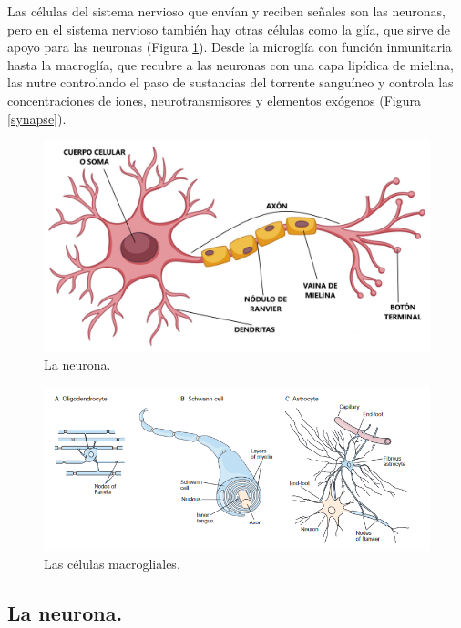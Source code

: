 Las células del sistema nervioso que envían y reciben señales son las neuronas, pero en el sistema nervioso también hay otras células como la glía, que sirve de apoyo para las neuronas (Figura \ref{neuron}). Desde la microglía con función inmunitaria hasta la macroglía, que recubre a las neuronas con una capa lipídica de mielina, las nutre controlando el paso de sustancias del torrente sanguíneo y controla las concentraciones de iones, neurotransmisores y elementos exógenos (Figura \ref{synapse}).

\begin{figure}[H]
	\centering

	\includegraphics[width=\linewidth]{media/5-neuron.jpg}
	\caption{La neurona.}
	\label{neuron}
\end{figure}

\begin{figure}[H]
	\centering

	\includegraphics[width=\linewidth]{media/5-glia.png}
	\caption{Las células macrogliales.}
	\label{glia}
\end{figure}

\subsection{La neurona.}

